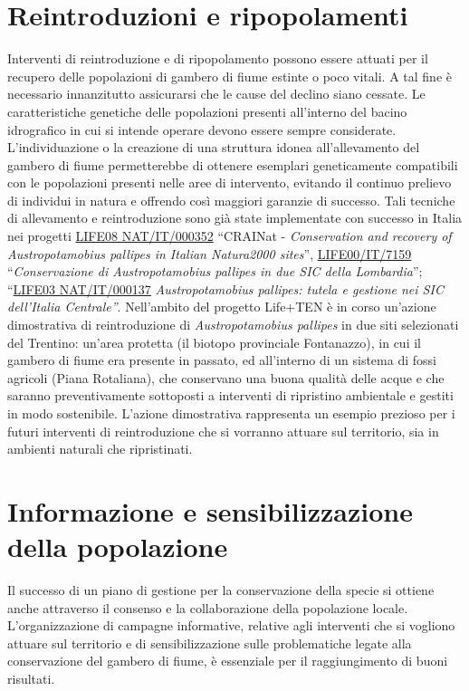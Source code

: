 \documentclass[10pt,twoside,openany,x11names,svgnames,italian,a5paper,dvipsnames,table]{memoir}
\begin{document}
\section{Reintroduzioni e ripopolamenti}
Interventi di reintroduzione e di ripopolamento possono essere attuati per il recupero delle popolazioni di gambero di fiume estinte o poco vitali. A tal fine è necessario innanzitutto assicurarsi che le cause del declino siano cessate. Le caratteristiche genetiche delle popolazioni presenti all’interno del bacino idrografico in cui si intende operare devono essere sempre considerate. L’individuazione o la creazione di una struttura idonea all’allevamento del gambero di fiume permetterebbe di ottenere esemplari geneticamente compatibili con le popolazioni presenti nelle aree di intervento, evitando il continuo prelievo di individui in natura e offrendo così maggiori garanzie di successo. Tali tecniche di allevamento e reintroduzione sono già state implementate con successo in Italia nei progetti \href{http://www.lifecrainat.eu/progetto.php}{LIFE08 NAT/IT/000352} “CRAINat - \emph{Conservation and recovery of \emph{Austropotamobius pallipes} in Italian Natura2000 sites}”, \href{http://www.sinanet.isprambiente.it/gelso/banca-dati/ente-di-gestione-area-protetta/parco-regionale-della-valle-del-lambro/conservazione-del-gambero-di-fiume-austropotamobius-pallipes-in-due-sic-della-lombardia}{LIFE00/IT/7159} “\emph{Conservazione di \emph{Austropotamobius pallipes} in due SIC della Lombardia}”; “\href{http://ec.europa.eu/environment/life/project/Projects/index.cfm/fuseaction/home.showFile/rep/file/fil/index.cfm?fuseaction=search.dspPage&n_proj_id=2467&docType=pdf}{LIFE03 NAT/IT/000137} \emph{\emph{Austropotamobius pallipes}: tutela e gestione nei SIC dell’Italia Centrale”}. 
Nell’ambito del progetto Life+TEN è in corso un’azione dimostrativa di reintroduzione di \emph{Austropotamobius pallipes} in due siti selezionati del Trentino: un’area protetta (il biotopo provinciale Fontanazzo), in cui il gambero di fiume era presente in passato, ed all’interno di un sistema di fossi agricoli (Piana Rotaliana), che conservano una buona qualità delle acque e che saranno preventivamente sottoposti a interventi di ripristino ambientale e gestiti in modo sostenibile. L’azione dimostrativa rappresenta un esempio prezioso per i futuri interventi di reintroduzione che si vorranno attuare sul territorio, sia in ambienti naturali che ripristinati.

\newpage
\section{Informazione e sensibilizzazione della popolazione}
Il successo di un piano di gestione per la conservazione della specie si ottiene anche attraverso il consenso e la collaborazione della popolazione locale. L’organizzazione di campagne informative, relative agli interventi che si vogliono attuare sul territorio e di sensibilizzazione sulle problematiche legate alla conservazione del gambero di fiume, è essenziale per il raggiungimento di buoni risultati.
\end{document}
